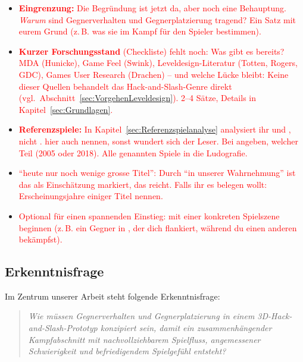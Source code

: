 \documentclass[../Main.tex]{subfiles}
\begin{document}
\begin{itemize}[leftmargin=1.5cm]
    \item \textcolor{red}{\textbf{Eingrenzung:} Die Begründung ist jetzt da, aber noch eine Behauptung. \emph{Warum} sind Gegnerverhalten und Gegnerplatzierung tragend? Ein Satz mit eurem Grund (z.\,B. was sie im Kampf für den Spieler bestimmen).}
    \item \textcolor{red}{\textbf{Kurzer Forschungsstand} (Checkliste) fehlt noch: Was gibt es bereits? MDA (Hunicke), Game Feel (Swink), Leveldesign-Literatur (Totten, Rogers, GDC), Games User Research (Drachen) -- und welche Lücke bleibt: Keine dieser Quellen behandelt das Hack-and-Slash-Genre direkt (vgl.\ Abschnitt~\ref{sec:VorgehenLeveldesign}). 2--4 Sätze, Details in Kapitel~\ref{sec:Grundlagen}.}
    \item \textcolor{red}{\textbf{Referenzspiele:} In Kapitel~\ref{sec:Referenzspielanalyse} analysiert ihr  und , nicht .  hier auch nennen, sonst wundert sich der Leser. Bei  angeben, welcher Teil (2005 oder 2018). Alle genannten Spiele in die Ludografie.}
    \item \textcolor{red}{\enquote{heute nur noch wenige grosse Titel}: Durch \enquote{in unserer Wahrnehmung} ist das als Einschätzung markiert, das reicht. Falls ihr es belegen wollt: Erscheinungsjahre einiger Titel nennen.}
    \item \textcolor{red}{Optional für einen spannenden Einstieg: mit einer konkreten Spielszene beginnen (z.\,B. ein Gegner in , der dich flankiert, während du einen anderen bekämpfst).}
\end{itemize}

\subsection{Erkenntnisfrage} \label{sec:Erkenntnisfrage}

Im Zentrum unserer Arbeit steht folgende Erkenntnisfrage:

\vspace{\baselineskip}

\begin{quote}
    \textit{Wie müssen Gegnerverhalten und Gegnerplatzierung in einem 3D-Hack-and-Slash-Prototyp konzipiert sein, damit ein zusammenhängender Kampfabschnitt mit nachvollziehbarem Spielfluss, angemessener Schwierigkeit und befriedigendem Spielgefühl entsteht?}
\end{quote}
\end{document}
